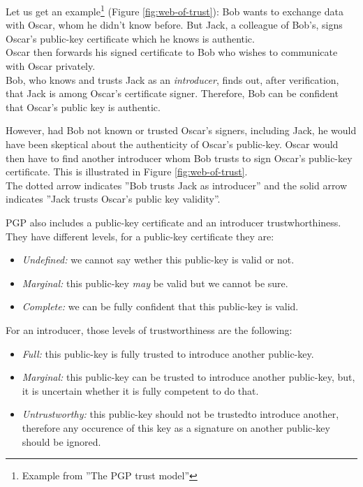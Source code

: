 \documentclass[journal, a4paper]{IEEEtran}
\begin{document}
Let us get an example\footnote{Example from ''The PGP trust model''\cite{caronni2000}} (Figure \ref{fig:web-of-trust}): Bob wants to exchange data with Oscar, whom he didn't know before. But Jack, a colleague of Bob's, signs Oscar's public-key certificate which he knows is authentic.\\
Oscar then forwards his signed certificate to Bob who wishes to communicate with Oscar privately.\\
Bob, who knows and trusts Jack as an \textit{introducer}, finds out, after verification, that Jack is among Oscar's certificate signer. Therefore, Bob can be confident that Oscar's public key is authentic.

However, had Bob not known or trusted Oscar's signers, including Jack, he would have been skeptical about the authenticity of Oscar's public-key. Oscar would then have to find another introducer whom Bob trusts to sign Oscar's public-key certificate. This is illustrated in Figure \ref{fig:web-of-trust}.\\
The dotted arrow indicates ''Bob trusts Jack as introducer'' and the solid arrow indicates ''Jack trusts Oscar’s public key validity''. 


PGP also includes a public-key certificate and an introducer trustwhorthiness. They have different levels, for a public-key certificate they are:
\begin{itemize}
	\item \textit{Undefined:} we cannot say wether this public-key is valid or not.
	\item \textit{Marginal:} this public-key \textit{may} be valid but we cannot be sure.
	\item \textit{Complete:} we can be fully confident that this public-key is valid.
\end{itemize}
For an introducer, those levels of trustworthiness are the following:
\begin{itemize}
	\item \textit{Full:} this public-key is fully trusted to introduce another public-key.
	\item \textit{Marginal:} this public-key can be trusted to introduce another public-key, but, it is uncertain whether it is fully competent to do that.
	\item \textit{Untrustworthy:} this public-key should not be trustedto introduce another, therefore any occurence of this key as a signature on another public-key should be ignored.
\end{itemize}
\end{document}
